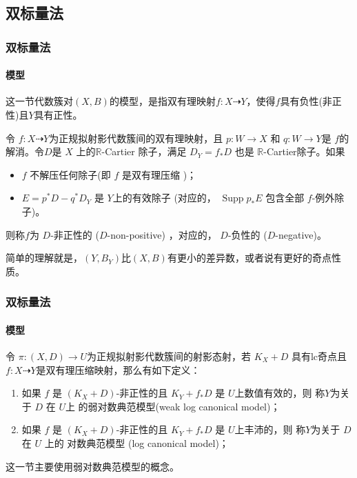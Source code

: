 \documentclass[10pt]{ctexbeamer}
\begin{document}
\subsection{双标量法}
\begin{frame}[shrink]
  \frametitle{双标量法}
  \framesubtitle{模型}
 这一节代数簇对$(X,B)$的模型，是指双有理映射$f:X \dashrightarrow Y$，使得$f$具有负性(非正性)且$Y$具有正性。

  \pause
\begin{definition}\label{negativemap}
  \citeauthor[Definition 3.6.1]{BCHM10}令 $f:X\dashrightarrow Y$为正规拟射影代数簇间的双有理映射，且 $p:W\to X$ 和 $q:W\to Y$是 $f$的解消。令$D$是 $X$ 上的$\mathbb{R}$-Cartier 除子，满足  $D_{Y}=f_*D$ 也是 $\mathbb{R}$-Cartier除子。如果
  \begin{itemize}
    \item $f$ 不解压任何除子(即 $f$ 是双有理压缩 )；
    \item $E=p^{*}D-q^*D_Y$ 是  $Y$上的有效除子 (对应的， $\operatorname{Supp}p_*E$ 包含全部 $f$-例外除子)。
  \end{itemize}
 则称$f$为 $D$-非正性的  ($D$-non-positive) ，对应的， $D$-负性的 ($D$-negative)。
\end{definition}
  \pause
简单的理解就是，$(Y,B_{Y})$比$(X,B)$有更小的差异数，或者说有更好的奇点性质。

\end{frame}

\begin{frame}[shrink]
  \frametitle{双标量法}
  \framesubtitle{模型}
  \begin{definition}[模型]\label{models}
  \citeauthor[Definition 3.6.7]{BCHM10} 令 $ \pi:(X,D)\to U $为正规拟射影代数簇间的射影态射，若 $ K_X+D $ 具有lc奇点且$ f:X\dashrightarrow Y $是双有理压缩映射，那么有如下定义：
  \begin{enumerate}
    \item 如果 $f$ 是  $ (K_X+D) $-非正性的且 $ K_Y+f_*D $ 是 $ U $上数值有效的，则  称$ Y $为关于 $D$ 在 $U$上 的弱对数典范模型(weak log canonical model)；
    \item 如果 $f$ 是  $ (K_X+D) $-非正性的且 $ K_Y+f_*D $ 是 $ U $上丰沛的，则  称$ Y $为关于 $D$ 在 $U$ 上的  对数典范模型 (log canonical model)；
  \end{enumerate}
\end{definition}
  \pause
这一节主要使用弱对数典范模型的概念。
\end{frame}
\end{document}

